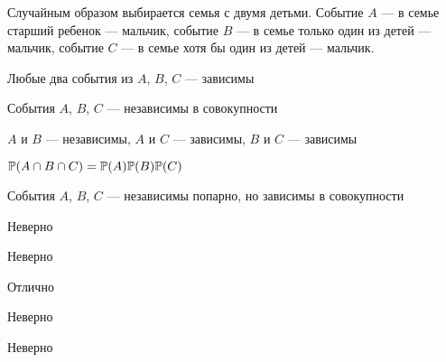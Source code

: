 
\begin{question}
Случайным образом выбирается семья с двумя детьми. Событие \(A\) --- в
семье старший ребенок --- мальчик, событие \(B\) --- в семье только один
из детей --- мальчик, событие \(C\) --- в семье хотя бы один из детей
--- мальчик.
\begin{answerlist}
  \item Любые два события из \(A\), \(B\), \(C\) --- зависимы
  \item События \(A\), \(B\), \(C\) --- независимы в совокупности
  \item \(A\) и \(B\) --- независимы, \(A\) и \(C\) --- зависимы, \(B\) и \(C\)
--- зависимы
  \item \(\P(A\cap B\cap C)=\P(A)\P(B)\P(C)\)
  \item События \(A\), \(B\), \(C\) --- независимы попарно, но зависимы в
совокупности
\end{answerlist}
\end{question}

\begin{solution}
\begin{answerlist}
  \item Неверно
  \item Неверно
  \item Отлично
  \item Неверно
  \item Неверно
\end{answerlist}
\end{solution}

